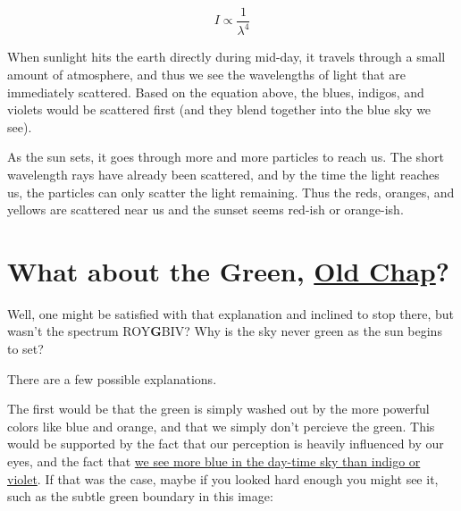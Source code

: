 \documentclass[12pt]{article}
\begin{document}
\begin{displaymath}
  I \propto \frac{1}{\lambda^4}
\end{displaymath}

When sunlight hits the earth directly during mid-day, it travels through
a small amount of atmosphere, and thus we see the wavelengths of light
that are immediately scattered. Based on the equation above, the blues,
indigos, and violets would be scattered first (and they blend together
into the blue sky we see).


As the sun sets, it goes through more and more particles to reach us.
The short wavelength rays have already been scattered, and by the time
the light reaches us, the particles can only scatter the light
remaining. Thus the reds, oranges, and yellows are scattered near us and
the sunset seems red-ish or orange-ish.



\section{\texorpdfstring{What about the Green,
\href{http://www.shmoop.com/great-gatsby/green-light-symbol.html}{Old
Chap}?}{What about the Green, Old Chap?}}\label{what-about-the-green-old-chap}

Well, one might be satisfied with that explanation and inclined to stop
there, but wasn't the spectrum ROY\textbf{G}BIV? Why is the sky never
green as the sun begins to set?

There are a few possible explanations.

The first would be that the green is simply washed out by the more
powerful colors like blue and orange, and that we simply don't percieve
the green. This would be supported by the fact that our perception is
heavily influenced by our eyes, and the fact that
\href{http://physics.stackexchange.com/a/28903}{we see more blue in the
day-time sky than indigo or violet}. If that was the case, maybe if you
looked hard enough you might see it, such as the subtle green boundary
in this image:
\end{document}
